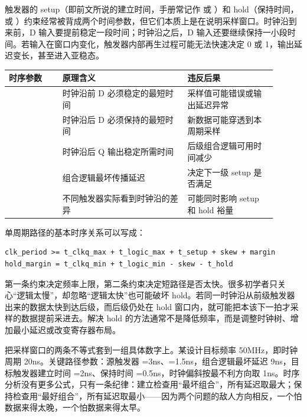 触发器的 setup（即前文所说的建立时间，手册常记作  或 ）和 hold（保持时间， 或 ）约束经常被背成两个时间参数，但它们本质上是在说明采样窗口。时钟沿到来前，D 输入要提前稳定一段时间；时钟沿之后，D 输入还要继续保持一小段时间。若输入在窗口内变化，触发器内部再生过程可能无法快速决定 0 或 1，输出延迟变长，甚至进入亚稳态。

\begin{longtable}{L{0.18\linewidth}L{0.42\linewidth}L{0.3\linewidth}}
\toprule
时序参数 & 原理含义 & 违反后果 \\
\midrule
{} & 时钟沿前 D 必须稳定的最短时间 & 采样值可能错误或输出延迟异常 \\\tablerowrule
{} & 时钟沿后 D 必须保持的最短时间 & 新数据可能穿透到本周期采样 \\\tablerowrule
{} & 时钟沿后 Q 输出稳定所需时间 & 后级组合逻辑可用时间减少 \\\tablerowrule
{} & 组合逻辑最坏传播延迟 & 决定下一级 setup 是否满足 \\\tablerowrule
{} & 不同触发器实际看到时钟沿的差异 & 可能同时影响 setup 和 hold 裕量 \\
\bottomrule
\end{longtable}

单周期路径的基本时序关系可以写成：

\begin{lstlisting}
clk_period >= t_clkq_max + t_logic_max + t_setup + skew + margin
hold_margin = t_clkq_min + t_logic_min - skew - t_hold
\end{lstlisting}

第一条约束决定频率上限，第二条约束决定短路径是否太快。很多初学者只关心“逻辑太慢”，却忽略“逻辑太快”也可能破坏 hold。若同一时钟沿从前级触发器出来的数据太快到达后级，而后级仍处在 hold 窗口内，就可能把本该下一拍才采样的数据提前采进去。解决 hold 的方法通常不是降低频率，而是调整时钟树、增加最小延迟或改变寄存器布局。


把采样窗口的两条不等式套到一组具体数字上。某设计目标频率 50MHz，即时钟周期 20ns。关键路径参数：源触发器 =3ns、=1.5ns，组合逻辑最坏延迟 9ns，目标触发器建立时间 =2ns、保持时间 =0.5ns，时钟偏斜按最不利方向取 1ns。时序分析没有更多公式，只有一条纪律：建立检查用“最坏组合”，所有延迟取最大；保持检查用“最好组合”，所有延迟取最小——因为两个问题的敌人方向相反，一个怕数据来得太晚，一个怕数据来得太早。

